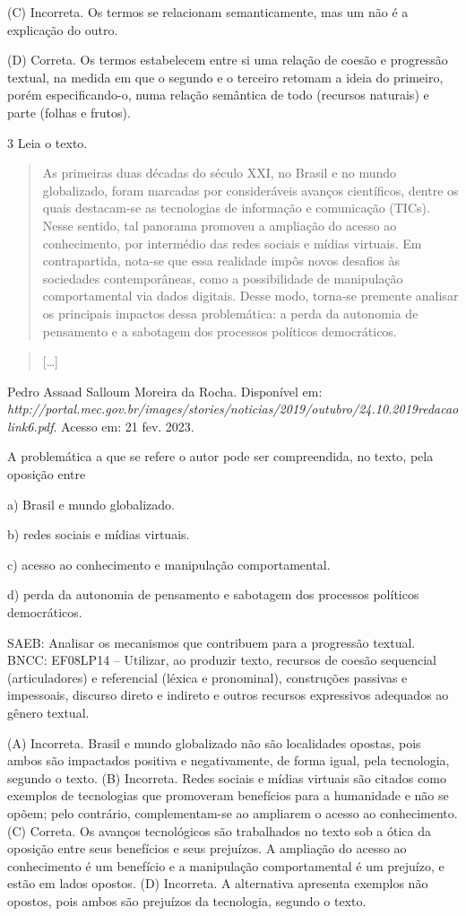 (C) Incorreta. Os termos se relacionam semanticamente, mas um não é a
explicação do outro.

(D) Correta. Os termos estabelecem entre si uma relação de coesão e
progressão textual, na medida em que o segundo e o terceiro retomam a
ideia do primeiro, porém especificando-o, numa relação semântica de todo
(recursos naturais) e parte (folhas e frutos).

\num{3} Leia o texto.

\begin{quote}
As primeiras duas décadas do século XXI, no Brasil e no mundo
globalizado, foram marcadas por consideráveis avanços científicos,
dentre os quais destacam-se as tecnologias de informação e comunicação
(TICs). Nesse sentido, tal panorama promoveu a ampliação do acesso ao
conhecimento, por intermédio das redes sociais e mídias virtuais. Em
contrapartida, nota-se que essa realidade impôs novos desafios às
sociedades contemporâneas, como a possibilidade de manipulação
comportamental via dados digitais. Desse modo, torna-se premente
analisar os principais impactos dessa problemática: a perda da autonomia
de pensamento e a sabotagem dos processos políticos democráticos.
\end{quote}

\begin{quote}
{[}\ldots{]}
\end{quote}

Pedro Assaad Salloum Moreira da Rocha. Disponível em:
\emph{http://portal.mec.gov.br/images/stories/noticias/2019/outubro/24.10.2019redacaolink6.pdf}.
Acesso em: 21 fev. 2023.

A problemática a que se refere o autor pode ser compreendida, no texto,
pela oposição entre

a) Brasil e mundo globalizado.

b) redes sociais e mídias virtuais.

c) acesso ao conhecimento e manipulação comportamental.

d) perda da autonomia de pensamento e sabotagem dos processos políticos
democráticos.

SAEB: Analisar os mecanismos que contribuem para a progressão textual.
BNCC: EF08LP14 -- Utilizar, ao produzir texto, recursos de coesão
sequencial (articuladores) e referencial (léxica e pronominal),
construções passivas e impessoais, discurso direto e indireto e outros
recursos expressivos adequados ao gênero textual.

(A) Incorreta. Brasil e mundo globalizado não são localidades opostas,
pois ambos são impactados positiva e negativamente, de forma igual, pela
tecnologia, segundo o texto. (B) Incorreta. Redes sociais e mídias
virtuais são citados como exemplos de tecnologias que promoveram
benefícios para a humanidade e não se opõem; pelo contrário,
complementam-se ao ampliarem o acesso ao conhecimento. (C) Correta. Os
avanços tecnológicos são trabalhados no texto sob a ótica da oposição
entre seus benefícios e seus prejuízos. A ampliação do acesso ao
conhecimento é um benefício e a manipulação comportamental é um
prejuízo, e estão em lados opostos. (D) Incorreta. A alternativa
apresenta exemplos não opostos, pois ambos são prejuízos da tecnologia,
segundo o texto.

